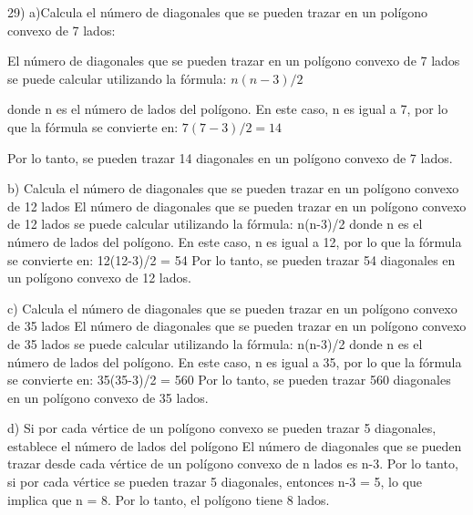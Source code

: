 \documentclass{article}
\begin{document}
29) a)Calcula el número de diagonales que se pueden trazar en un polígono convexo de 7 lados:

El número de diagonales que se pueden trazar en un polígono convexo de 7 lados se puede calcular utilizando la fórmula:
$n(n-3)/2$

donde n es el número de lados del polígono. En este caso, n es igual a 7, por lo que la fórmula se convierte en:
$7(7-3)/2 = 14$

Por lo tanto, se pueden trazar 14 diagonales en un polígono convexo de 7 lados.

b) Calcula el número de diagonales que se pueden trazar en un polígono convexo de 12 lados
El número de diagonales que se pueden trazar en un polígono convexo de 12 lados se puede calcular utilizando la fórmula:  n(n-3)/2  donde n es el número de lados del polígono. En este caso, n es igual a 12, por lo que la fórmula se convierte en:  12(12-3)/2 = 54  Por lo tanto, se pueden trazar 54 diagonales en un polígono convexo de 12 lados.


c) Calcula el número de diagonales que se pueden trazar en un polígono convexo de 35 lados
El número de diagonales que se pueden trazar en un polígono convexo de 35 lados se puede calcular utilizando la fórmula:  n(n-3)/2  donde n es el número de lados del polígono. En este caso, n es igual a 35, por lo que la fórmula se convierte en:  35(35-3)/2 = 560  Por lo tanto, se pueden trazar 560 diagonales en un polígono convexo de 35 lados.

d) Si por cada vértice de un polígono convexo se pueden trazar 5 diagonales, establece el número de lados del
polígono
El número de diagonales que se pueden trazar desde cada vértice de un polígono convexo de n lados es n-3. Por lo tanto, si por cada vértice se pueden trazar 5 diagonales, entonces n-3 = 5, lo que implica que n = 8. Por lo tanto, el polígono tiene 8 lados.
\end{document}
